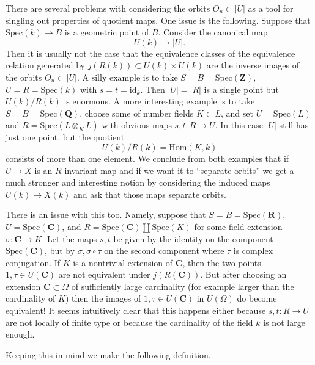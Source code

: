 \noindent
There are several problems with considering the orbits $O_u \subset |U|$
as a tool for singling out properties of quotient maps. One issue is the
following. Suppose that $\text{Spec}(k) \to B$
is a geometric point of $B$. Consider the canonical map
$$
U(k) \longrightarrow |U|.
$$
Then it is usually not the case that the equivalence classes
of the equivalence relation generated by $j(R(k)) \subset U(k) \times U(k)$
are the inverse images of the orbits $O_u \subset |U|$.
A silly example is to take $S = B = \text{Spec}(\mathbf{Z})$,
$U = R = \text{Spec}(k)$ with $s = t = \text{id}_k$. Then $|U| = |R|$ is
a single point but $U(k)/R(k)$ is enormous.
A more interesting example is to take $S = B = \text{Spec}(\mathbf{Q})$,
choose some of number fields $K \subset L$, and set $U = \text{Spec}(L)$
and $R = \text{Spec}(L \otimes_K L)$ with obvious maps $s, t : R \to U$.
In this case $|U|$ still has just one point, but the quotient
$$
U(k)/R(k) = \text{Hom}(K, k)
$$
consists of more than one element. We conclude from both examples
that if $U \to X$ is an $R$-invariant map and if we want it to
``separate orbits'' we get a much stronger and interesting notion by
considering the induced maps $U(k) \to X(k)$ and ask that
those maps separate orbits.

\medskip\noindent
There is an issue with this too. Namely, suppose that
$S = B = \text{Spec}(\mathbf{R})$,
$U = \text{Spec}(\mathbf{C})$, and
$R = \text{Spec}(\mathbf{C}) \amalg \text{Spec}(K)$
for some field extension $\sigma : \mathbf{C} \to K$.
Let the maps $s, t$ be given by the identity on the component
$\text{Spec}(\mathbf{C})$, but by $\sigma, \sigma \circ \tau$ on the
second component where $\tau$ is complex conjugation. If
$K$ is a nontrivial extension of $\mathbf{C}$, then the two points
$1, \tau \in U(\mathbf{C})$ are not equivalent under
$j(R(\mathbf{C}))$. But after choosing an extension $\mathbf{C} \subset \Omega$
of sufficiently large cardinality (for example larger than the cardinality
of $K$) then the images of $1, \tau \in U(\mathbf{C})$ in
$U(\Omega)$ do become equivalent! It seems intuitively clear that
this happens either because $s, t : R \to U$ are not locally of finite type
or because the cardinality of the field $k$ is not large enough.

\medskip\noindent
Keeping this in mind we make the following definition.


